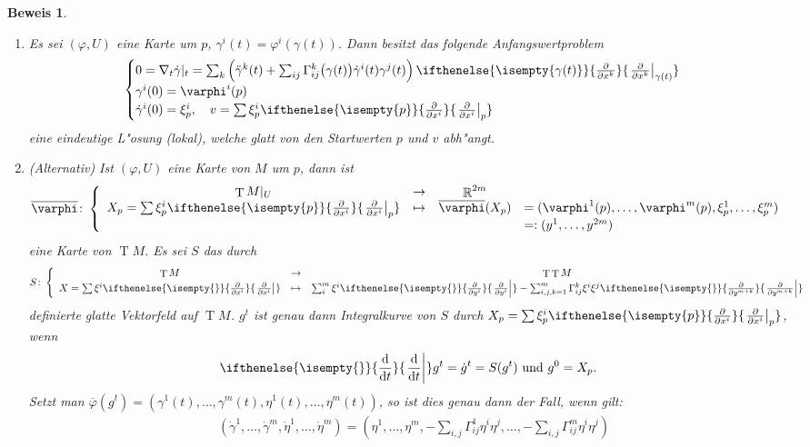 \documentclass[paper=A4, twoside, chapterprefix=true, bibliography=totoc, headsepline]{scrbook}
\let\temp\phi
\let\phi\varphi
\let\varphi\temp
\let\temp\theta
\let\theta\vartheta
\let\vartheta\temp
\let\temp\epsilon
\let\epsilon\varepsilon
\let\varepsilon\temp
\let\temp\rho
\let\rho\varrho
\let\varrho\temp
\DeclareMathOperator{\R}{\mathbb{R}}
\DeclareMathOperator{\T}{T} %
\newcommand{\dop}{\mathrm{d}}
\newcommand{\difffrac}[3][]{\ifthenelse{\isempty{#1}}{\frac{\dop #2}{\dop #3}}{\left. \frac{\dop #2}{\dop #3} \right|_{#1}}}
\newcommand{\pdifffrac}[3][]{\ifthenelse{\isempty{#1}}{\frac{\partial #2}{\partial #3}}{\left. \frac{\partial #2}{\partial #3} \right|_{#1}}}
\theoremstyle{plain}
\theoremstyle{nonumberplain}
\newtheorem{bew}{Beweis}
\theoremstyle{empty}
\theoremstyle{break}
\begin{document}
\begin{bew}
  \begin{enumerate}[label=(\Alph*),leftmargin=*,widest=B]
  \item Es sei $(\phi, U)$ eine Karte um $p$, $\gamma^i(t) = \phi^i(\gamma(t))$. Dann besitzt das folgende Anfangswertproblem
    \begin{align*}
      \begin{cases}
        0 = \nabla_t\dot \gamma|_t = \sum_k\left(\ddot \gamma^k(t) + \sum_{ij}\Gamma_{ij}^k\big(\gamma(t)\big)\dot \gamma^i(t)\gamma^j(t)\right) \pdifffrac[\gamma(t)]{}{x^k}\\
        \gamma^i(0) = \phi^i(p)\\
        \dot\gamma^i(0) = \xi_p^i, \quad v = \sum \xi^i_p\pdifffrac[p]{}{x^i}
      \end{cases}
    \end{align*}
    eine eindeutige L"osung (lokal), welche glatt von den Startwerten $p$ und $v$ abh"angt.
  \item (Alternativ) Ist $(\phi, U)$ eine Karte von $M$ um $p$, dann ist
    \[ \overline \phi \colon \left\{\begin{array}{cccl}
        \T M|_U &\to& \R^{2m}&\\
        X_p=\sum \xi_p^i\pdifffrac[p]{}{x^i} &\mapsto& \overline\phi(X_p) &= (\phi^1(p), \ldots, \phi^m(p), \xi_p^1, \ldots, \xi_p^m)\\
        &&& =: (y^1, \ldots, y^{2m})
      \end{array}\right.\]
    eine Karte von $\T M$.	
    Es sei $S$ das durch
    \[ S \colon \left\{ \begin{array}{ccc}
        \T M &\to& \T\T M\\
        X = \sum \xi^i \pdifffrac{}{x^i} &\mapsto& \sum_i^m \xi^i \pdifffrac{}{y^i} - \sum_{i,j,k=1}^{m} \Gamma_{ij}^k \xi^i\xi^j\pdifffrac{}{y^{m+k}}
      \end{array}\right.\]
    definierte glatte Vektorfeld auf $\T M$.	
    $g^t$ ist genau dann Integralkurve von $S$ durch $X_p = \sum \xi_p^i\pdifffrac[p]{}{x^i}$, wenn
    \begin{align*}
      \difffrac{}{t}g^t = \dot g^t = S(g^t) \text{ und } g^0 = X_p.
    \end{align*}
    Setzt man $\overline \phi(g^t) = (\gamma^1(t), \ldots, \gamma^m(t),\eta^1(t), \ldots, \eta^m(t))$, so ist dies genau dann der Fall, wenn gilt:
    \begin{align*}
      & (\dot\gamma^1,\ldots, \dot\gamma^m,\dot\eta^1,\ldots, \dot\eta^m) = \left(\eta^1, \ldots, \eta^m, -\sum_{i,j}\Gamma_{ij}^1\eta^i\eta^j, \ldots, -\sum_{i,j}\Gamma_{ij}^m\eta^i\eta^j\right)\\

\end{align*}
\end{enumerate}
\end{bew}
\end{document}
